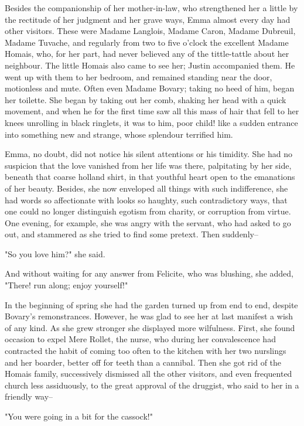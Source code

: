 \documentclass[11pt,twocolumn]{ltugboat}
\begin{document}
Besides the companionship of her mother-in-law, who strengthened her a
little by the rectitude of her judgment and her grave ways, Emma almost
every day had other visitors. These were Madame Langlois, Madame Caron,
Madame Dubreuil, Madame Tuvache, and regularly from two to five o'clock
the excellent Madame Homais, who, for her part, had never believed any
of the tittle-tattle about her neighbour. The little Homais also came to
see her; Justin accompanied them. He went up with them to her bedroom,
and remained standing near the door, motionless and mute. Often even
Madame Bovary; taking no heed of him, began her toilette. She began by
taking out her comb, shaking her head with a quick movement, and when
he for the first time saw all this mass of hair that fell to her knees
unrolling in black ringlets, it was to him, poor child! like a sudden
entrance into something new and strange, whose splendour terrified him.

Emma, no doubt, did not notice his silent attentions or his timidity.
She had no suspicion that the love vanished from her life was there,
palpitating by her side, beneath that coarse holland shirt, in that
youthful heart open to the emanations of her beauty. Besides, she
now enveloped all things with such indifference, she had words so
affectionate with looks so haughty, such contradictory ways, that one
could no longer distinguish egotism from charity, or corruption from
virtue. One evening, for example, she was angry with the servant, who
had asked to go out, and stammered as she tried to find some pretext.
Then suddenly--

"So you love him?" she said.

And without waiting for any answer from Felicite, who was blushing, she
added, "There! run along; enjoy yourself!"

In the beginning of spring she had the garden turned up from end to end,
despite Bovary's remonstrances. However, he was glad to see her at last
manifest a wish of any kind. As she grew stronger she displayed more
wilfulness. First, she found occasion to expel Mere Rollet, the nurse,
who during her convalescence had contracted the habit of coming too
often to the kitchen with her two nurslings and her boarder, better
off for teeth than a cannibal. Then she got rid of the Homais family,
successively dismissed all the other visitors, and even frequented
church less assiduously, to the great approval of the druggist, who said
to her in a friendly way--

"You were going in a bit for the cassock!"
\end{document}
